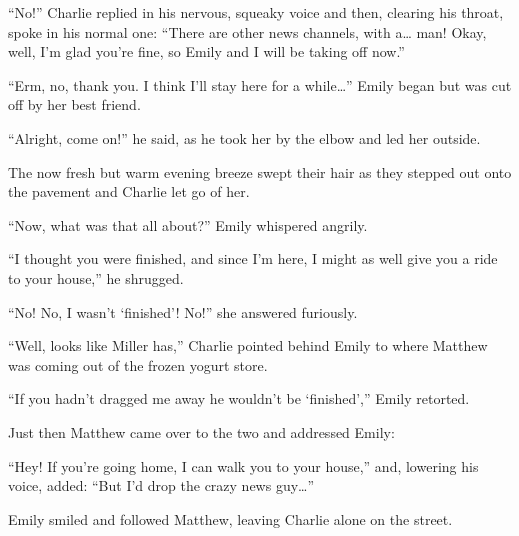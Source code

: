 “No!” Charlie replied in his nervous, squeaky voice and then, clearing his throat, spoke in his normal one: “There are other news channels, with a… man! Okay, well, I'm glad you're fine, so Emily and I will be taking off now.”

“Erm, no, thank you. I think I'll stay here for a while…” Emily began but was cut off by her best friend.

“Alright, come on!” he said, as he took her by the elbow and led her outside.

The now fresh but warm evening breeze swept their hair as they stepped out onto the pavement and Charlie let go of her.

“Now, what was that all about?” Emily whispered angrily.

“I thought you were finished, and since I'm here, I might as well give you a ride to your house,” he shrugged.

“No! No, I wasn't ‘finished'! No!” she answered furiously.

“Well, looks like Miller has,” Charlie pointed behind Emily to where Matthew was coming out of the frozen yogurt store.

“If you hadn't dragged me away he wouldn't be ‘finished',” Emily retorted.

Just then Matthew came over to the two and addressed Emily:

“Hey! If you're going home, I can walk you to your house,” and, lowering his voice, added: “But I'd drop the crazy news guy…”

Emily smiled and followed Matthew, leaving Charlie alone on the street.